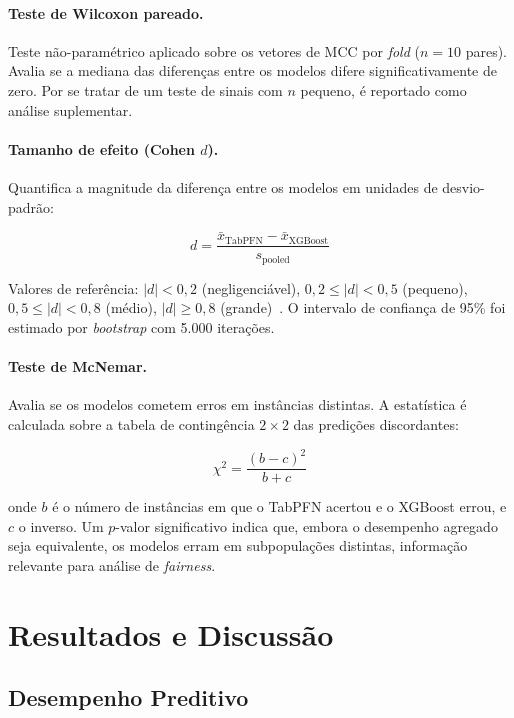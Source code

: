 \documentclass[12pt]{article}
\begin{document}
\paragraph{Teste de Wilcoxon pareado.} Teste não-paramétrico aplicado sobre os vetores de MCC por \textit{fold} ($n=10$ pares). Avalia se a mediana das diferenças entre os modelos difere significativamente de zero. Por se tratar de um teste de sinais com $n$ pequeno, é reportado como análise suplementar.

\paragraph{Tamanho de efeito (Cohen $d$).} Quantifica a magnitude da diferença entre os modelos em unidades de desvio-padrão:

\begin{equation}
d = \frac{\bar{x}_{\text{TabPFN}} - \bar{x}_{\text{XGBoost}}}{s_{\text{pooled}}}
\end{equation}

Valores de referência: $|d| < 0{,}2$ (negligenciável), $0{,}2 \leq |d| < 0{,}5$ (pequeno), $0{,}5 \leq |d| < 0{,}8$ (médio), $|d| \geq 0{,}8$ (grande)~\cite{cohen:1988}. O intervalo de confiança de 95\% foi estimado por \textit{bootstrap} com 5.000 iterações.

\paragraph{Teste de McNemar.} Avalia se os modelos cometem erros em instâncias distintas. A estatística é calculada sobre a tabela de contingência $2 \times 2$ das predições discordantes:

\begin{equation}
\chi^2 = \frac{(b - c)^2}{b + c}
\end{equation}

onde $b$ é o número de instâncias em que o TabPFN acertou e o XGBoost errou, e $c$ o inverso. Um $p$-valor significativo indica que, embora o desempenho agregado seja equivalente, os modelos erram em subpopulações distintas, informação relevante para análise de \textit{fairness}.

\section{Resultados e Discussão} \label{sec:resultados}

\subsection{Desempenho Preditivo}
\end{document}
